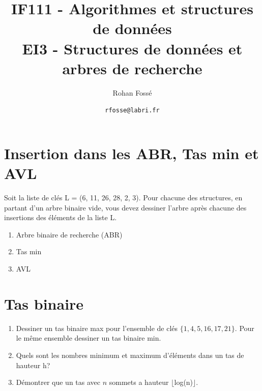 \documentclass{article}[12pt]
\title{IF111 - Algorithmes et structures de données\\EI3 - Structures de données et arbres de recherche}
\date{\texttt{rfosse@labri.fr}}
\author{Rohan Fossé}
\begin{document}
\maketitle{}

\section*{Insertion dans les ABR, Tas min et AVL}
    Soit la liste de clés L = (6, 11, 26, 28, 2, 3). Pour chacune des structures, en partant d’un arbre binaire vide, vous devez dessiner l’arbre après chacune des insertions des éléments de la liste L.
    \begin{enumerate}
        \item Arbre binaire de recherche (ABR)
        \item Tas min
        \item AVL
    \end{enumerate}

    
    
    
\section*{Tas binaire}
\begin{enumerate}
\item Dessiner un tas binaire max pour l'ensemble de clés $\{1,4,5,16,17,21\}$. Pour le même ensemble dessiner un tas binaire min.
\item Quels sont les nombres minimum et maximum d'éléments dans un tas de hauteur h?

\item Démontrer que un tas avec $n$ sommets a hauteur $\lfloor$log(n)$\rfloor$.
\end{enumerate}
\end{document}

